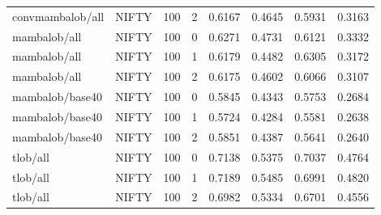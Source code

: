 {\begin{longtable}{@{}lllrrrrr@{}}
convmambalob/all & NIFTY & 100 & 2 & 0.6167 & 0.4645 & 0.5931 & 0.3163 \\
mambalob/all & NIFTY & 100 & 0 & 0.6271 & 0.4731 & 0.6121 & 0.3332 \\
mambalob/all & NIFTY & 100 & 1 & 0.6179 & 0.4482 & 0.6305 & 0.3172 \\
mambalob/all & NIFTY & 100 & 2 & 0.6175 & 0.4602 & 0.6066 & 0.3107 \\
mambalob/base40 & NIFTY & 100 & 0 & 0.5845 & 0.4343 & 0.5753 & 0.2684 \\
mambalob/base40 & NIFTY & 100 & 1 & 0.5724 & 0.4284 & 0.5581 & 0.2638 \\
mambalob/base40 & NIFTY & 100 & 2 & 0.5851 & 0.4387 & 0.5641 & 0.2640 \\
tlob/all & NIFTY & 100 & 0 & 0.7138 & 0.5375 & 0.7037 & 0.4764 \\
tlob/all & NIFTY & 100 & 1 & 0.7189 & 0.5485 & 0.6991 & 0.4820 \\
tlob/all & NIFTY & 100 & 2 & 0.6982 & 0.5334 & 0.6701 & 0.4556 \\
\end{longtable}
}
